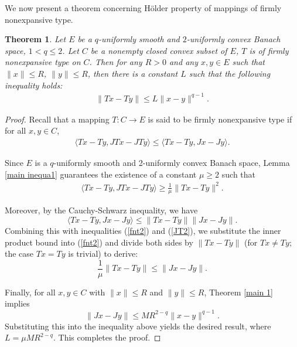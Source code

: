 \documentclass[12pt,a4paper]{amsart}
\newtheorem{theorem}{Theorem}[section]
\theoremstyle{definition}
\numberwithin{equation}{section}
\begin{document}

We now present a theorem concerning H\"{o}lder property of mappings of firmly nonexpansive type.
\begin{theorem}\label{main thm}
  Let $E$ be a $q$-uniformly smooth and $2$-uniformly convex Banach space, $1< q \leq 2$. Let \( C \) be a nonempty closed convex subset of \( E \), \( T \) is of firmly nonexpansive type on $C$. Then for any \( R > 0 \) and any \( x, y \in E \) such that \( \|x\| \leq R\), \( \|y\| \leq R\), then there is a constant $L$ such that the following inequality holds:
  \begin{align*}
    \|Tx - Ty\| \leq L \|x-y\|^{q-1}.
  \end{align*}
\end{theorem}
\begin{proof}
Recall that a mapping \( T: C \to E \) is said to be firmly nonexpansive type if for all \( x, y \in C \),
\begin{align}\label{fnt2}
\langle Tx - Ty, JTx - JTy \rangle \leq \langle Tx - Ty, Jx - Jy \rangle.
\end{align}

Since \( E \) is a \( q \)-uniformly smooth and 2-uniformly convex Banach space, Lemma \ref{main inequa1} guarantees the existence of a constant \( \mu \geq 2 \) such that
\begin{align}\label{JT2}
\langle Tx - Ty, JTx - JTy \rangle \geq \frac{1}{\mu} \|Tx - Ty\|^2.
\end{align}

Moreover, by the Cauchy-Schwarz inequality, we have
\[
\langle Tx - Ty, Jx - Jy \rangle \leq \|Tx - Ty\| \|Jx - Jy\|.
\]
Combining this with inequalities (\ref{fnt2}) and (\ref{JT2}), we substitute the inner product bound into (\ref{fnt2}) and divide both sides by \( \|Tx - Ty\| \) (for \( Tx \neq Ty \); the case \( Tx = Ty \) is trivial) to derive:
\[
\frac{1}{\mu} \|Tx - Ty\| \leq \|Jx - Jy\|.
\]

Finally, for all \( x, y \in C \) with \( \|x\| \leq R \) and \( \|y\| \leq R \), Theorem \ref{main 1} implies
\[
\|Jx - Jy\| \leq MR^{2-q} \|x - y\|^{q-1}.
\]
Substituting this into the inequality above yields the desired result, where $L=\mu MR^{2-q}$. This completes the proof.
\end{proof}
\end{document}
